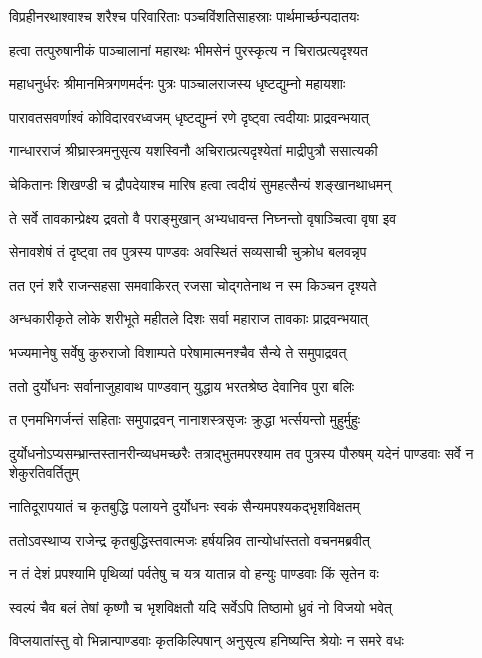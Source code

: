 \twolineshloka
{विप्रहीनरथाश्वाश्च शरैश्च परिवारिताः}
{पञ्चविंशतिसाहस्राः पार्थमार्च्छन्पदातयः}


\twolineshloka
{हत्वा तत्पुरुषानीकं पाञ्चालानां महारथः}
{भीमसेनं पुरस्कृत्य न चिरात्प्रत्यदृश्यत}


\twolineshloka
{महाधनुर्धरः श्रीमानमित्रगणमर्दनः}
{पुत्रः पाञ्चालराजस्य धृष्टद्युम्नो महायशाः}


\twolineshloka
{पारावतसवर्णाश्वं कोविदारवरध्वजम्}
{धृष्टद्युम्नं रणे दृष्ट्वा त्वदीयाः प्राद्रवन्भयात्}


\twolineshloka
{गान्धारराजं श्रीघ्रास्त्रमनुसृत्य यशस्विनौ}
{अचिरात्प्रत्यदृश्येतां माद्रीपुत्रौ ससात्यकी}


\twolineshloka
{चेकितानः शिखण्डी च द्रौपदेयाश्च मारिष}
{हत्वा त्वदीयं सुमहत्सैन्यं शङ्खानथाधमन्}


\twolineshloka
{ते सर्वे तावकान्प्रेक्ष्य द्रवतो वै पराङ्मुखान्}
{अभ्यधावन्त निघ्नन्तो वृषाञ्चित्वा वृषा इव}


\twolineshloka
{सेनावशेषं तं दृष्ट्वा तव पुत्रस्य पाण्डवः}
{अवस्थितं सव्यसाची चुक्रोध बलवन्नृप}


\twolineshloka
{तत एनं शरै राजन्सहसा समवाकिरत्}
{रजसा चोद्गतेनाथ न स्म किञ्चन दृश्यते}


\twolineshloka
{अन्धकारीकृते लोके शरीभूते महीतले}
{दिशः सर्वा महाराज तावकाः प्राद्रवन्भयात्}


\twolineshloka
{भज्यमानेषु सर्वेषु कुरुराजो विशाम्पते}
{परेषामात्मनश्चैव सैन्ये ते समुपाद्रवत्}


\twolineshloka
{ततो दुर्योधनः सर्वानाजुहावाथ पाण्डवान्}
{युद्धाय भरतश्रेष्ठ देवानिव पुरा बलिः}


\twolineshloka
{त एनमभिगर्जन्तं सहिताः समुपाद्रवन्}
{नानाशस्त्रसृजः क्रुद्धा भर्त्सयन्तो मुहुर्मुहुः}


दुर्योधनोऽप्यसम्भ्रान्तस्तानरीन्व्यधमच्छरैः
\twolineshloka
{तत्राद्भुतमपरश्याम तव पुत्रस्य पौरुषम्}
{यदेनं पाण्डवाः सर्वे न शेकुरतिवर्तितुम्}


\twolineshloka
{नातिदूरापयातं च कृतबुद्धि पलायने}
{दुर्योधनः स्वकं सैन्यमपश्यकद्भृशविक्षतम्}


\twolineshloka
{ततोऽवस्थाप्य राजेन्द्र कृतबुद्धिस्तवात्मजः}
{हर्षयन्निव तान्योधांस्ततो वचनमब्रवीत्}


\twolineshloka
{न तं देशं प्रपश्यामि पृथिव्यां पर्वतेषु च}
{यत्र यातान्न वो हन्युः पाण्डवाः किं सृतेन वः}


\twolineshloka
{स्वल्पं चैव बलं तेषां कृष्णौ च भृशविक्षतौ}
{यदि सर्वेऽपि तिष्ठामो ध्रुवं नो विजयो भवेत्}


\twolineshloka
{विप्लयातांस्तु वो भिन्नान्पाण्डवाः कृतकिल्पिषान्}
{अनुसृत्य हनिष्यन्ति श्रेयोः न समरे वधः}


